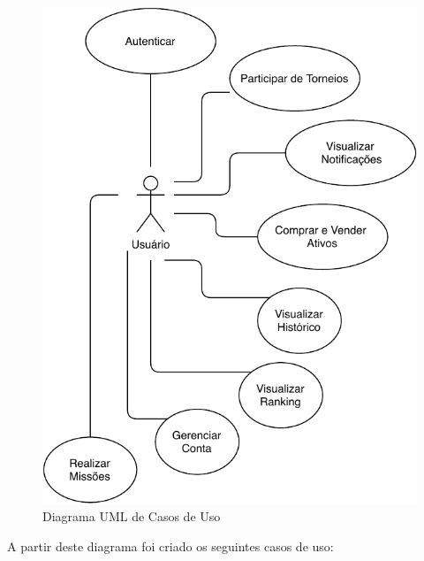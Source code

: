 \begin{figure}[H]
  \caption{\label{fig:uml_caso_uso}Diagrama UML de Casos de Uso}
  \centering
  \includegraphics[scale=1]{imagens/tfc_use_case.pdf}
\end{figure}

A partir deste diagrama foi criado os seguintes casos de uso:

